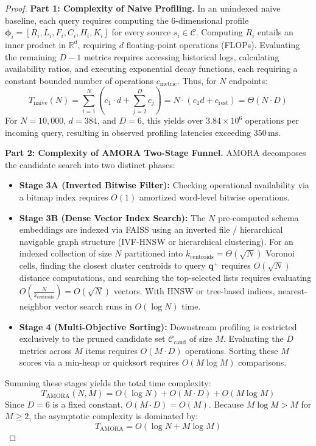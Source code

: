 \begin{proof}
\textbf{Part 1: Complexity of Naive Profiling.}
In an unindexed naive baseline, each query requires computing the 6-dimensional profile $\boldsymbol{\phi}_i = [R_i, L_i, F_i, C_i, H_i, K_i]$ for every source $s_i \in \mathcal{C}$. Computing $R_i$ entails an inner product in $\mathbb{R}^d$, requiring $d$ floating-point operations (FLOPs). Evaluating the remaining $D-1$ metrics requires accessing historical logs, calculating availability ratios, and executing exponential decay functions, each requiring a constant bounded number of operations $c_{\text{metric}}$. Thus, for $N$ endpoints:
\begin{equation}
    T_{\text{naive}}(N) = \sum_{i=1}^N \left( c_1 \cdot d + \sum_{j=2}^D c_j \right) = N \cdot (c_1 d + c_{\text{rest}}) = \Theta(N \cdot D)
\end{equation}
For $N = 10,000$, $d = 384$, and $D = 6$, this yields over $3.84 \times 10^6$ operations per incoming query, resulting in observed profiling latencies exceeding $350\,\text{ms}$.

\textbf{Part 2: Complexity of AMORA Two-Stage Funnel.}
AMORA decomposes the candidate search into two distinct phases:
\begin{itemize}
    \item \textbf{Stage 3A (Inverted Bitwise Filter):} Checking operational availability via a bitmap index requires $O(1)$ amortized word-level bitwise operations.
    \item \textbf{Stage 3B (Dense Vector Index Search):} The $N$ pre-computed schema embeddings are indexed via FAISS using an inverted file / hierarchical navigable graph structure (IVF-HNSW or hierarchical clustering). For an indexed collection of size $N$ partitioned into $k_{\text{centroids}} = \Theta(\sqrt{N})$ Voronoi cells, finding the closest cluster centroids to query $\mathbf{q}^+$ requires $O(\sqrt{N})$ distance computations, and searching the top-selected lists requires evaluating $O(\frac{N}{k_{\text{centroids}}}) = O(\sqrt{N})$ vectors. With HNSW or tree-based indices, nearest-neighbor vector search runs in $O(\log N)$ time.
    \item \textbf{Stage 4 (Multi-Objective Sorting):} Downstream profiling is restricted exclusively to the pruned candidate set $\mathcal{C}_{\text{cand}}$ of size $M$. Evaluating the $D$ metrics across $M$ items requires $O(M \cdot D)$ operations. Sorting these $M$ scores via a min-heap or quicksort requires $O(M \log M)$ comparisons.
\end{itemize}
Summing these stages yields the total time complexity:
\begin{equation}
    T_{\text{AMORA}}(N, M) = O(\log N) + O(M \cdot D) + O(M \log M)
\end{equation}
Since $D = 6$ is a fixed constant, $O(M \cdot D) = O(M)$. Because $M \log M > M$ for $M \ge 2$, the asymptotic complexity is dominated by:
\begin{equation}
    T_{\text{AMORA}} = O(\log N + M \log M)
\end{equation}


\end{proof}
